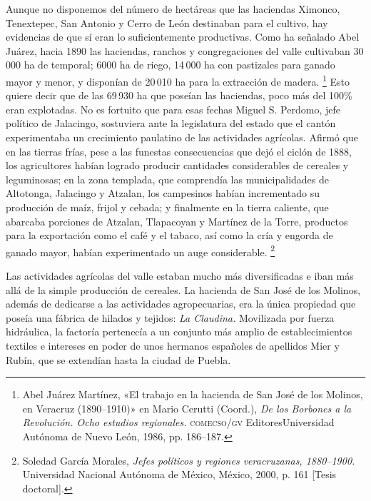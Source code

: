 \documentclass[14pt,twoside,final]{extbook} %
\let\oldfootnote\footnote
\renewcommand\footnote[1]{%
\oldfootnote{\hspace{1mm}#1}}
\begin{document}
Aunque no disponemos del número de hectáreas que las haciendas Ximonco, Tenextepec, San Antonio y Cerro de León destinaban para el cultivo, hay evidencias de que sí eran lo suficientemente productivas. Como ha señalado Abel Juárez, hacia 1890 las haciendas, ranchos y congregaciones del valle cultivaban 30\,000 ha de temporal; 6000 ha de riego, 14\,000 ha con pastizales para ganado mayor y menor, y disponían de 20\,010 ha para la extracción de madera.\footnote{Abel Juárez Martínez, «El trabajo en la hacienda de San José de los Molinos, en Veracruz (\mbox{1890--1910})» en Mario Cerutti (Coord.), \emph{De los Borbones a la Revolución. Ocho estudios regionales.} \textsc{comecso/gv} Editores\kernedslash Universidad Autónoma de Nuevo León, 1986, pp. 186--187.} Esto quiere decir que de las 69\,930 ha que poseían las haciendas, poco más del 100\% eran explotadas. No es fortuito que para esas fechas Miguel S. Perdomo, jefe político de Jalacingo, sostuviera ante la legislatura del estado que el cantón experimentaba un crecimiento paulatino de las actividades agrícolas. Afirmó que en las tierras frías, pese a las funestas consecuencias que dejó el ciclón de 1888, los agricultores habían logrado producir cantidades considerables de cereales y leguminosas; en la zona templada, que comprendía las municipalidades de Altotonga, Jalacingo y Atzalan, los campesinos habían incrementado su producción de maíz, frijol y cebada; y finalmente en la tierra caliente, que abarcaba porciones de Atzalan, Tlapacoyan y Martínez de la Torre, productos para la exportación como el café y el tabaco, así como la cría y engorda de ganado mayor, habían experimentado un auge considerable.\footnote{Soledad García Morales, \emph{Jefes políticos y regiones veracruzanas, 1880--1900.} Universidad Nacional Autónoma de México, México, 2000, p. 161 [Tesis doctoral].}

Las actividades agrícolas del valle estaban mucho más diversificadas e iban más allá de la simple producción de cereales. La hacienda de San José de los Molinos, además de dedicarse a las actividades agropecuarias, era la única propiedad que poseía una fábrica de hilados y tejidos: \emph{La Claudina.} Movilizada por fuerza hidráulica, la factoría pertenecía a un conjunto más amplio de establecimientos textiles e intereses en poder de unos hermanos españoles de apellidos Mier y Rubín, que se extendían hasta la ciudad de Puebla.
\end{document}
